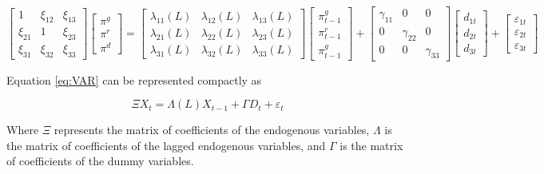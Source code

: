 \documentclass[]{article}
\begin{document}
\small

\begin{equation}
\begin{bmatrix} 1 & \xi_{12} & \xi_{13}\\ 
\xi_{21} & 1 & \xi_{23}\\
\xi_{31} & \xi_{32} & \xi_{33}
\end{bmatrix}
\begin{bmatrix} \pi^{g}\\
\pi^{r}\\
\pi^{d}
\end{bmatrix}=\begin{bmatrix}\lambda_{11}(L) & \lambda_{12}(L) & \lambda_{13}(L)\\
\lambda_{21}(L) & \lambda_{22}(L) & \lambda_{23}(L)\\
\lambda_{31}(L) & \lambda_{32}(L) & \lambda_{33}(L) 
\end{bmatrix}
\begin{bmatrix}\pi_{t-1}^{g}\\ \pi_{t-1}^{r}\\ \pi_{t-1}^{g}
\end{bmatrix}+
\begin{bmatrix}\gamma_{11} & 0 & 0\\
0 & \gamma_{22} & 0\\
0 & 0 & \gamma_{33}
\end{bmatrix}
\begin{bmatrix}d_{1t}\\ d_{2t}\\ d_{3t}
\end{bmatrix} +
\begin{bmatrix} \varepsilon_{1t}\\ \varepsilon_{2t}\\ \varepsilon_{3t}
\end{bmatrix}
\label{eq:VAR}
\end{equation}

\large

Equation \eqref{eq:VAR} can be represented compactly as

\begin{equation}
\Xi X_{t}=\Lambda(L)X_{t-1}+\Gamma D_{t} +\varepsilon_{t} \label{eq:stable-VAR}
\end{equation}

Where \(\Xi\) represents the matrix of coefficients of the endogenous variables, \(\Lambda\) is the matrix of coefficients of the lagged endogenous variables, and \(\Gamma\) is the matrix of coefficients of the dummy variables.
\end{document}
